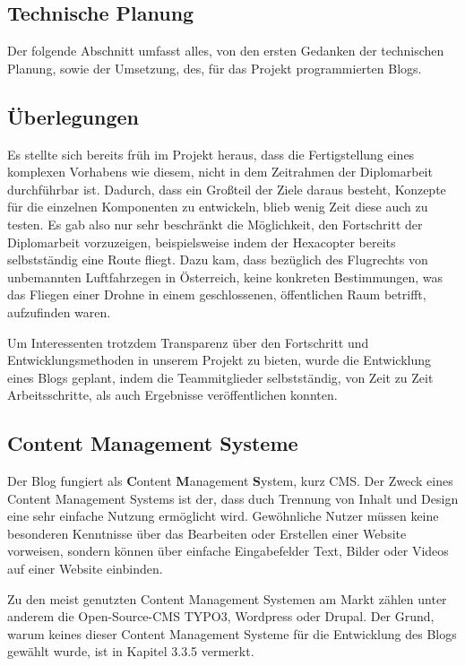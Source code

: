   \subsection{Technische Planung}
  Der folgende Abschnitt umfasst alles, von den ersten Gedanken der technischen Planung, sowie der Umsetzung,
  des, für das Projekt programmierten Blogs.

    \subsection*{Überlegungen}
    Es stellte sich bereits früh im Projekt heraus, dass die Fertigstellung eines komplexen Vorhabens wie diesem, nicht in
    dem Zeitrahmen der Diplomarbeit durchführbar ist. Dadurch, dass ein Großteil der Ziele daraus besteht, Konzepte für die
    einzelnen Komponenten zu entwickeln, blieb wenig Zeit diese auch zu testen. Es gab also nur sehr beschränkt die Möglichkeit,
    den Fortschritt der Diplomarbeit vorzuzeigen, beispielsweise indem der Hexacopter bereits selbstständig eine Route fliegt.
    Dazu kam, dass bezüglich des Flugrechts von unbemannten Luftfahrzegen in Österreich, keine konkreten Bestimmungen, was das Fliegen einer Drohne in einem
    geschlossenen, öffentlichen Raum betrifft, aufzufinden waren.

    Um Interessenten trotzdem Transparenz über den Fortschritt und Entwicklungsmethoden in unserem Projekt zu bieten, wurde
    die Entwicklung eines Blogs geplant, indem die Teammitglieder selbstständig, von Zeit zu Zeit Arbeitsschritte, als auch
    Ergebnisse veröffentlichen konnten.

    \subsection*{Content Management Systeme}
    Der Blog fungiert als \textbf{C}ontent \textbf{M}anagement \textbf{S}ystem, kurz CMS. Der Zweck eines
    Content Management Systems ist der, dass duch Trennung von Inhalt und Design eine
    sehr einfache Nutzung ermöglicht wird. Gewöhnliche Nutzer müssen keine besonderen
    Kenntnisse über das Bearbeiten oder Erstellen einer Website vorweisen, sondern
    können über einfache Eingabefelder Text, Bilder oder Videos auf einer Website einbinden.

    Zu den meist genutzten Content Management Systemen am Markt zählen unter anderem die Open-Source-CMS {TYPO3\cite{typo3}},
    {Wordpress\cite{wordpress}} oder {Drupal\cite{drupal}}. Der Grund, warum keines dieser Content Management Systeme für die
    Entwicklung des Blogs gewählt wurde, ist in Kapitel 3.3.5 vermerkt.

